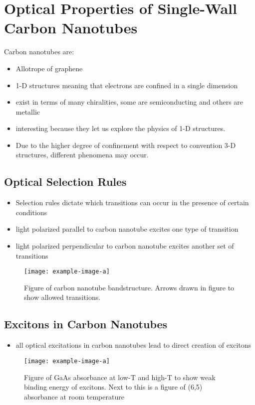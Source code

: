 \chapter{Optical Properties of Single-Wall Carbon Nanotubes}

Carbon nanotubes are:
\begin{itemize}
	\item Allotrope of graphene
	\item 1-D structures meaning that electrons are confined in a single dimension
	\item exist in terms of many chiralities, some are semiconducting and others are metallic
	\item interesting because they let us explore the physics of 1-D structures. 
	\item Due to the higher degree of confinement with respect to convention 3-D structures, different phenomena may occur.
\end{itemize}

\section{Optical Selection Rules}
\begin{itemize}
	\item Selection rules dictate which transitions can occur in the presence of certain conditions
	\item light polarized parallel to carbon nanotube excites one type of transition
	\item light polarized perpendicular to carbon nanotube excites another set of transitions
\end{itemize}

\begin{figure}[h]
	\centering
	\texttt{[image: example-image-a]}
	\caption{Figure of carbon nanotube bandstructure. Arrows drawn in figure to show allowed transitions.}
	\label{fig:beam_diamter_measurement}
\end{figure}

\section{Excitons in Carbon Nanotubes}
\begin{itemize}
	\item all optical excitations in carbon nanotubes lead to direct creation of excitons
\end{itemize}

\begin{figure}[h]
	\centering
	\texttt{[image: example-image-a]}
	\caption{Figure of GaAs absorbance at low-T and high-T to show weak binding energy of excitons. Next to this is a figure of  (6,5) absorbance at room temperature}
	\label{fig:gaas_vs_cnt_absorbance}
\end{figure}
